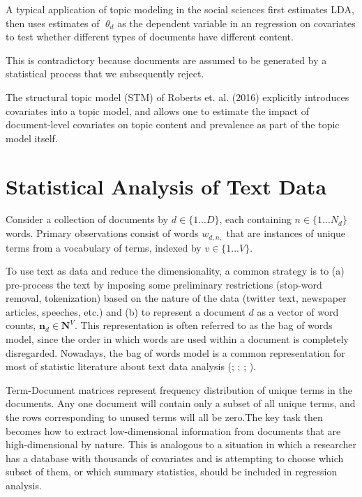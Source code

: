 \documentclass[12pt,a4paper,notitlepage]{article}
\begin{document}
A typical application of topic modeling in the social sciences first estimates LDA, then uses estimates of $\theta_d$ as the dependent variable in an regression on covariates to test whether different types of documents have different content. 

This is contradictory because documents are assumed to be generated by a statistical process that we subsequently reject.

The structural topic model (STM) of Roberts et. al. (2016) explicitly introduces covariates into a topic model, and allows one to estimate the impact of document-level covariates on topic content and prevalence as part of the topic model itself.

\section{Statistical Analysis of Text Data}

Consider a collection of documents by $d \in \lbrace 1 ... D \rbrace$, each containing $n \in \lbrace 1 ... N_d \rbrace$ words. Primary observations consist of words $w_{d,n,}$ that are instances of unique terms from a vocabulary of terms, indexed by $v \in \lbrace 1 ... V \rbrace$. 

To use text as data and reduce the dimensionality, a common strategy is to (a) pre-process the text by imposing some preliminary restrictions (stop-word removal, tokenization) based on the nature of the data (twitter text, newspaper articles, speeches, etc.) and (b) to represent a document $d$ as a vector of word counts, $\boldsymbol{n}_d \in \boldsymbol{N}^V$. This representation is often referred to as the bag of words model, since the order in which words are used within a document is completely disregarded. Nowadays, the bag of words model is a common representation for most of statistic literature about text data analysis (\citet{blei_latent_2003}; \citet{erosheva_mixed-membership_2004}; \citet{griffiths_finding_2004}; \citet{genkin_large-scale_2007}).

Term-Document matrices represent frequency distribution of unique terms in the documents. Any one document will contain only a subset of all unique terms, and the rows corresponding to unused terms will all be zero.The key task then becomes how to extract low-dimensional information from documents that are high-dimensional by nature. This is analogous to a situation in which a researcher has a database with thousands of covariates and is attempting to choose which subset of them, or which summary statistics, should be included in regression analysis.
\end{document}
